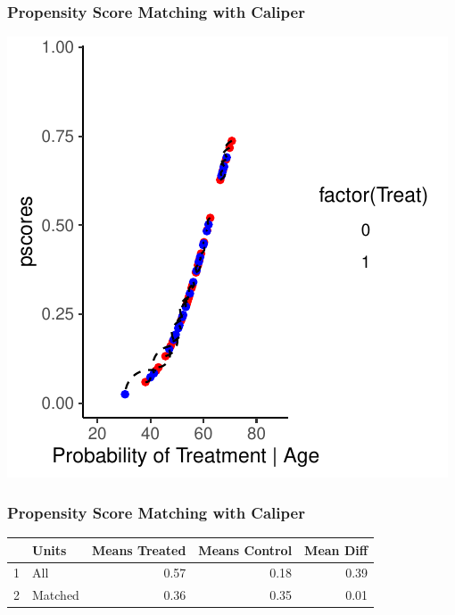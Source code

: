\documentclass[xcolor=x11names,compress]{beamer}\usepackage[]{graphicx}\usepackage[]{color}
\makeatletter
\def\maxwidth{ %
  \ifdim\Gin@nat@width>\linewidth
    \linewidth
  \else
    \Gin@nat@width
  \fi
}
\newenvironment{knitrout}{}{} %
\renewcommand{\(}{\begin{columns}}
\renewcommand{\)}{\end{columns}}
\newcommand{\<}[1]{\begin{column}{#1}}
\renewcommand{\>}{\end{column}}
\makeatother
\begin{document}
\begin{frame}
\frametitle{Propensity Score Matching with Caliper}
\begin{center}
\begin{knitrout}
\color{fgcolor}
\includegraphics[width=\maxwidth]{figure/pscore_matching_caliper_3-1} 

\end{knitrout}
\end{center}
\end{frame}

\begin{frame}
\frametitle{Propensity Score Matching with Caliper}
\begin{center}
\begin{table}[ht]
\centering
\begin{tabular}{rlrrr}
  \hline
 & Units & Means Treated & Means Control & Mean Diff \\ 
  \hline
1 & All & 0.57 & 0.18 & 0.39 \\ 
  2 & Matched & 0.36 & 0.35 & 0.01 \\ 
   \hline
\end{tabular}
\end{table}

\end{center}
\end{frame}
\end{document}
